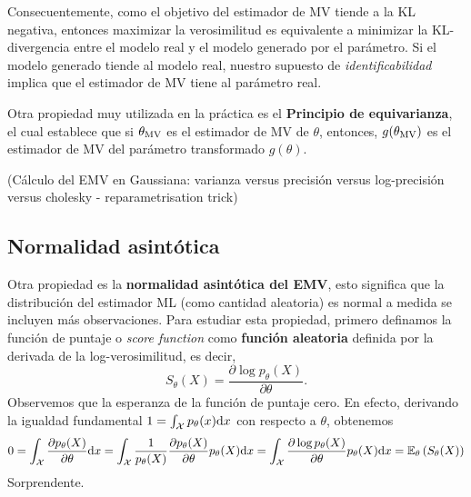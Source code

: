  Consecuentemente, como el objetivo del estimador de MV tiende a la KL negativa, entonces maximizar la verosimilitud es equivalente a minimizar la KL-divergencia entre el modelo real y el modelo generado por el parámetro. Si el modelo generado tiende al modelo real, nuestro supuesto de \textit{identificabilidad} implica que el estimador de MV tiene al parámetro real. 

 Otra propiedad muy utilizada en la práctica es el \textbf{Principio de equivarianza}, el cual establece que si ${\theta_\text{MV}}$ es el estimador de MV de $\theta$, entonces, $g({\theta_\text{MV}})$ es el estimador de MV del parámetro transformado $g(\theta)$.

\begin{example}(Cálculo del EMV en Gaussiana: varianza versus precisión versus log-precisión versus cholesky - reparametrisation trick)
	
\end{example}

\subsection{Normalidad asintótica}

Otra propiedad es la \textbf{normalidad asintótica del EMV}, esto significa que la distribución del estimador ML (como cantidad aleatoria) es normal a medida se incluyen más observaciones. Para estudiar esta propiedad, primero definamos la función de puntaje o \textit{score function} como \textbf{función aleatoria }definida por la derivada de la log-verosimilitud, es decir, 
\begin{equation}
	S_\theta(X) = \frac{\partial \log p_\theta(X)}{\partial\theta}.
\end{equation}
Observemos que la esperanza de la función de puntaje cero. En efecto, derivando la igualdad fundamental $1 = \int_{\mathcal X} p_\theta(x){\text{d}x}$ con respecto a $\theta$, obtenemos 
\begin{align}
	0 = \int_{\mathcal X} \frac{\partial  p_\theta(X)}{\partial\theta} {\text{d}x} = \int_{\mathcal X} \frac{1}{p_\theta(X)}\frac{\partial  p_\theta(X)}{\partial\theta} p_\theta(X) {\text{d}x} = \int_{\mathcal X} \frac{\partial \log   p_\theta(X)}{\partial\theta} p_\theta(X) {\text{d}x} = \mathbb{E}_\theta \left(S_\theta(X)\right)
\end{align}
Sorprendente. 

